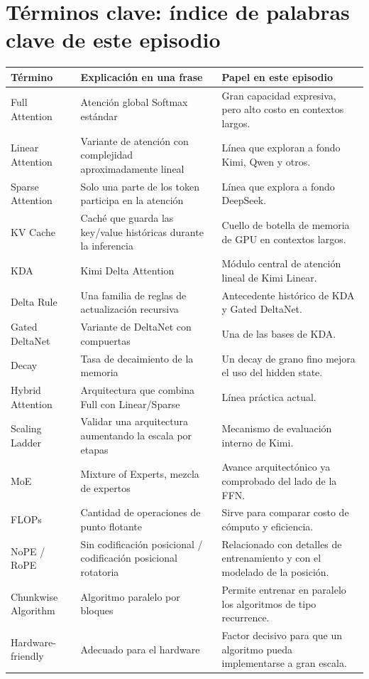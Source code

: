 \section{Términos clave: índice de palabras clave de este episodio}

\begin{longtable}{p{}p{}p{}}
\toprule
Término & Explicación en una frase & Papel en este episodio \\
\midrule
Full Attention & Atención global Softmax estándar & Gran capacidad expresiva, pero alto costo en contextos largos. \\
Linear Attention & Variante de atención con complejidad aproximadamente lineal & Línea que exploran a fondo Kimi, Qwen y otros. \\
Sparse Attention & Solo una parte de los token participa en la atención & Línea que explora a fondo DeepSeek. \\
KV Cache & Caché que guarda las key/value históricas durante la inferencia & Cuello de botella de memoria de GPU en contextos largos. \\
KDA & Kimi Delta Attention & Módulo central de atención lineal de Kimi Linear. \\
Delta Rule & Una familia de reglas de actualización recursiva & Antecedente histórico de KDA y Gated DeltaNet. \\
Gated DeltaNet & Variante de DeltaNet con compuertas & Una de las bases de KDA. \\
Decay & Tasa de decaimiento de la memoria & Un decay de grano fino mejora el uso del hidden state. \\
Hybrid Attention & Arquitectura que combina Full con Linear/Sparse & Línea práctica actual. \\
Scaling Ladder & Validar una arquitectura aumentando la escala por etapas & Mecanismo de evaluación interno de Kimi. \\
MoE & Mixture of Experts, mezcla de expertos & Avance arquitectónico ya comprobado del lado de la FFN. \\
FLOPs & Cantidad de operaciones de punto flotante & Sirve para comparar costo de cómputo y eficiencia. \\
NoPE / RoPE & Sin codificación posicional / codificación posicional rotatoria & Relacionado con detalles de entrenamiento y con el modelado de la posición. \\
Chunkwise Algorithm & Algoritmo paralelo por bloques & Permite entrenar en paralelo los algoritmos de tipo recurrence. \\
Hardware-friendly & Adecuado para el hardware & Factor decisivo para que un algoritmo pueda implementarse a gran escala. \\
\bottomrule
\end{longtable}

